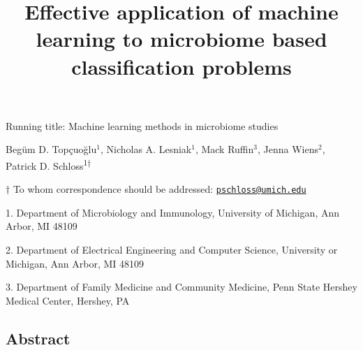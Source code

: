 \documentclass[11pt,]{article}
\title{\textbf{Effective application of machine learning to microbiome based
classification problems}}
\author{}
\date{}
\begin{document}
\maketitle

\vspace{35mm}

Running title: Machine learning methods in microbiome studies

\vspace{35mm}

Begüm D. Topçuoğlu\({^1}\), Nicholas A. Lesniak\({^1}\), Mack
Ruffin\({^3}\), Jenna Wiens\({^2}\), Patrick D.
Schloss\textsuperscript{1\(\dagger\)}

\vspace{38mm}

\(\dagger\) To whom correspondence should be addressed:
\href{mailto:pschloss@umich.edu}{\nolinkurl{pschloss@umich.edu}}

1. Department of Microbiology and Immunology, University of Michigan,
Ann Arbor, MI 48109

2. Department of Electrical Engineering and Computer Science, University
or Michigan, Ann Arbor, MI 48109

3. Department of Family Medicine and Community Medicine, Penn State
Hershey Medical Center, Hershey, PA

\newpage

\linenumbers

\subsection{Abstract}\label{abstract}
\end{document}
